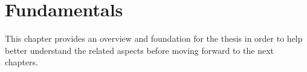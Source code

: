 \chapter{Fundamentals}
This chapter provides an overview and foundation for the thesis in order to help better understand the related aspects before moving forward to the next chapters.



